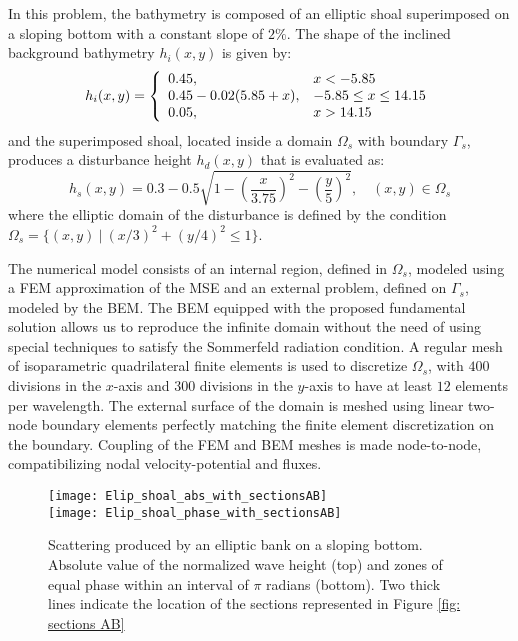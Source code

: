 In this problem, the bathymetry is composed of an elliptic shoal superimposed on a sloping bottom with a constant slope of $2\%$. The shape of the inclined background bathymetry $h_i(x,y)$ is given by:
%
\begin{equation}
h_i(x,y)=\left\lbrace 
\begin{array}{l l}
0.45,& x<-5.85 \\
0.45-0.02(5.85+x), & -5.85 \leq x \leq 14.15 \\
0.05, & x>14.15 
\end{array}
\right.
\end{equation}
%
and the superimposed shoal, located inside a domain $\Omega_s$ with boundary $\Gamma_s$, produces a disturbance height $h_d(x,y)$ that is evaluated as:
%
\begin{equation}
h_s(x,y)=0.3-0.5\sqrt{1-\left(\dfrac{x}{3.75}\right)^{2}-\left(\dfrac{y}{5}\right)^{2}}, \quad (x,y) \in \Omega_s
\end{equation}
%
where the elliptic domain of the disturbance is defined by the condition $\Omega_{s} = \{(x,y) \:| \:(x/3)^{2}+(y/4)^{2} \le 1\}$.

The numerical model consists of an internal region, defined in $\Omega_{s}$, modeled using a FEM approximation of the MSE and an external problem, defined on $\Gamma_s$, modeled by the BEM. The BEM equipped with the proposed fundamental solution allows us to reproduce the infinite domain without the need of using special techniques to satisfy the Sommerfeld radiation condition. A regular mesh of isoparametric quadrilateral finite elements is used to discretize $\Omega_{s}$, with $400$ divisions in the $x$-axis and $300$ divisions in the $y$-axis to have at least $12$ elements per wavelength. The external surface of the domain is meshed using linear two-node boundary elements perfectly matching the finite element discretization on the boundary. Coupling of the FEM and BEM meshes is made node-to-node, compatibilizing nodal velocity-potential and fluxes.

\begin{figure}
\begin{center}
\texttt{[image: Elip\_shoal\_abs\_with\_sectionsAB]} \\
\texttt{[image: Elip\_shoal\_phase\_with\_sectionsAB]}
\caption{Scattering produced by an elliptic bank on a sloping bottom. Absolute value of the normalized wave height (top) and zones of equal phase within an interval of $\pi$ radians (bottom). Two thick lines indicate the location of the sections represented in Figure \ref{fig: sections AB}}
\label{fig: el abs field with sections}
\end{center}
\end{figure}

